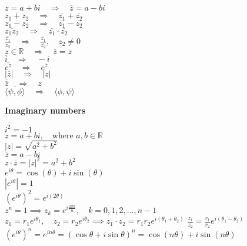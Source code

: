 \documentclass[a4paper,11pt]{article}
\renewcommand{\textbf}[1]{{\scriptsize	\bfseries #1}}
\begin{document}
\begin{footnotesize}
\begin{multicols}{2}
\begin{minipage}{\linewidth}
\( z = a + bi \quad \Rightarrow \quad \overline{z} = a - bi \)\\
\( \overline{z_1 + z_2} \quad \Rightarrow \quad \overline{z_1} + \overline{z_2} \)\\
\( \overline{z_1 - z_2} \quad \Rightarrow \quad \overline{z_1} - \overline{z_2} \)\\
\( \overline{z_1 z_2} \quad \Rightarrow \quad \overline{z_1} \cdot \overline{z_2} \)\\
\( \overline{\frac{z_1}{z_2}} \quad \Rightarrow \quad \frac{\overline{z_1}}{\overline{z_2}}, \quad z_2 \neq 0 \)\\
\( z \in \mathbb{R} \quad \Rightarrow \quad \overline{z} = z \)\\
\( \overline{i} \quad \Rightarrow \quad -i \)\\
\( \overline{e^z} \quad \Rightarrow \quad e^{\overline{z}} \)\\
\( |\overline{z}| \quad \Rightarrow \quad |z| \)\\
\( \overline{\overline{z}} \quad \Rightarrow \quad z \)\\
\( \overline{\langle \psi, \phi \rangle} \quad \Rightarrow \quad \langle \phi, \psi \rangle \)\\


\end{minipage}
\begin{minipage}{\linewidth}

\textbf{Imaginary numbers}

\( i^2 = -1 \) \\ 
\( z = a + bi, \quad \text{where } a, b \in \mathbb{R} \) \\
\( |z| = \sqrt{a^2 + b^2} \) \\
\( \overline{z} = a - bi \) \\
\( z \cdot \overline{z} = |z|^2 = a^2 + b^2 \) \\
\( e^{i\theta} = \cos(\theta) + i\sin(\theta) \) \\
\( |e^{i\theta}| = 1 \) \\
\( \left(e^{i\theta}\right)^2 = e^{i(2\theta)} \) \\
\( z^n = 1 \implies z_k = e^{i\frac{2\pi k}{n}}, \quad k = 0, 1, 2, \dots, n-1 \) \\
\( z_1 = r_1 e^{i\theta_1}, \quad z_2 = r_2 e^{i\theta_2} \implies
z_1 \cdot z_2 = r_1 r_2 e^{i(\theta_1 + \theta_2)} \)
\( \frac{z_1}{z_2} = \frac{r_1}{r_2} e^{i(\theta_1 - \theta_2)} \) \\
\( \left(e^{i\theta}\right)^n = e^{i n \theta} = (\cos\theta + i\sin\theta)^n = \cos(n\theta) + i\sin(n\theta) \) \\


\end{minipage}
\end{multicols}
\end{footnotesize}
\end{document}
